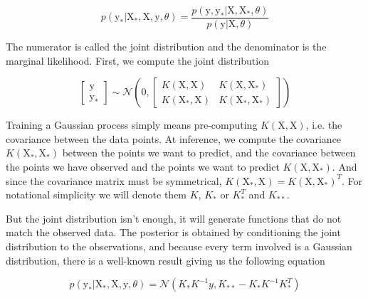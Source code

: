 \begin{equation}
    p\left( \mathrm{y_*} | \mathrm{X_*}, \mathrm{X}, \mathrm{y}, \theta \right)
    =
    \frac{p\left( \mathrm{y}, \mathrm{y_*} | \mathrm{X}, \mathrm{X_*}, \theta \right)}{p\left( \mathrm{y} | \mathrm{X}, \theta \right)}
\end{equation}

The numerator is called the joint distribution and the denominator is the marginal likelihood. First, we compute the joint distribution

\begin{equation}
    \begin{bmatrix}
    \mathrm{y} \\
    \mathrm{y_*}
    \end{bmatrix}
    \sim
    \mathcal{N} \left( 0, 
    \begin{bmatrix}
    K(\mathrm{X}, \mathrm{X}) & K(\mathrm{X}, \mathrm{X_*}) \\
    K(\mathrm{X_*}, \mathrm{X}) & K(\mathrm{X_*}, \mathrm{X_*})
    \end{bmatrix}
    \right)
\end{equation}

Training a Gaussian process simply means pre-computing $K(\mathrm{X}, \mathrm{X})$, i.e. the covariance between the data points. At inference, we compute the covariance $K(\mathrm{X_*}, \mathrm{X_*})$ between the points we want to predict, and the covariance between the points we have observed and the points we want to predict $K(\mathrm{X}, \mathrm{X_*})$. And since the covariance matrix must be symmetrical, $K(\mathrm{X_*}, \mathrm{X}) = K(\mathrm{X}, \mathrm{X_*})^T$. For notational simplicity we will denote them $K$, $K_*$ or $K_*^T$ and $K_{**}$.

But the joint distribution isn't enough, it will generate functions that do not match the observed data. The posterior is obtained by conditioning the joint distribution to the observations, and because every term involved is a Gaussian distribution, there is a well-known result giving us the following equation

\begin{equation}
    p\left( \mathrm{y_*} | \mathrm{X_*}, \mathrm{X}, \mathrm{y}, \theta \right)
    =
    \mathcal{N} \left( K_* K^{-1} y, 
    K_{**} - K_* K^{-1} K_*^T \right)
\end{equation}


